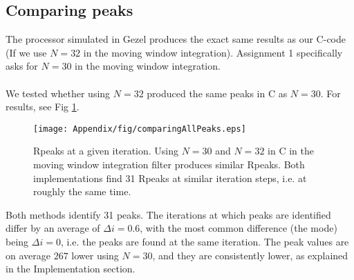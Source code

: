 \subsection{Comparing peaks}
\label{sec:AppComparingPeaks}

The processor simulated in Gezel produces the exact same results as our C-code (If we  use $N=32$ in the moving window integration). Assignment 1 specifically asks for $N=30$ in the moving window integration. \\
\\
We tested whether using $N=32$ produced the same peaks in C as $N=30$. For results, see Fig \ref{fig:comparingAllPeaks}.

\begin{figure}[H]
\centering
\texttt{[image: Appendix/fig/comparingAllPeaks.eps]}
\caption{Rpeaks at a given iteration. Using $N=30$ and $N=32$ in C in the moving window integration filter produces similar Rpeaks. Both implementations find 31 Rpeaks at similar iteration steps, i.e. at roughly the same time.}
\label{fig:comparingAllPeaks}
\end{figure}

Both methods identify 31 peaks. The iterations at which peaks are identified differ by an average of $\Delta i = 0.6$, with the most common difference (the mode) being $\Delta i = 0$, i.e. the peaks are found at the same iteration. The peak values are on average $267$ lower using $N=30$, and they are consistently lower, as explained in the Implementation section.